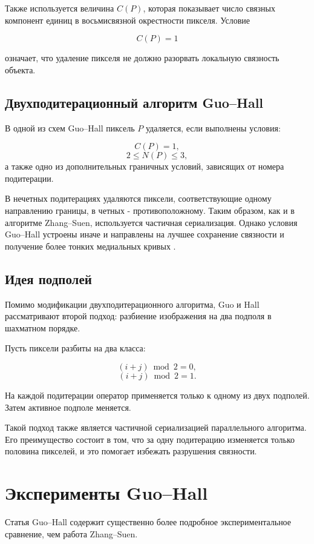 \documentclass[12pt,a4paper]{article}
\begin{document}
	Также используется величина $C(P)$, которая показывает число связных компонент единиц в восьмисвязной окрестности пикселя. Условие
	
	\[
	C(P)=1
	\]
	
	означает, что удаление пикселя не должно разорвать локальную связность объекта.
	
	\subsection{Двухподитерационный алгоритм Guo--Hall}
	
	В одной из схем Guo--Hall пиксель $P$ удаляется, если выполнены условия:
	
	\[
	C(P)=1,
	\]
	\[
	2 \le N(P) \le 3,
	\]
	а также одно из дополнительных граничных условий, зависящих от номера подитерации.
	
	В нечетных подитерациях удаляются пиксели, соответствующие одному направлению границы, в четных - противоположному. Таким образом, как и в алгоритме Zhang--Suen, используется частичная сериализация. Однако условия Guo--Hall устроены иначе и направлены на лучшее сохранение связности и получение более тонких медиальных кривых \cite{guo1989}.
	
	\subsection{Идея подполей}
	
	Помимо модификации двухподитерационного алгоритма, Guo и Hall рассматривают второй подход: разбиение изображения на два подполя в шахматном порядке.
	
	Пусть пиксели разбиты на два класса:
	
	\[
	(i+j)\bmod 2 = 0,
	\]
	\[
	(i+j)\bmod 2 = 1.
	\]
	
	На каждой подитерации оператор применяется только к одному из двух подполей. Затем активное подполе меняется.
	
	Такой подход также является частичной сериализацией параллельного алгоритма. Его преимущество состоит в том, что за одну подитерацию изменяется только половина пикселей, и это помогает избежать разрушения связности.
	
	\section{Эксперименты Guo--Hall}
	
	Статья Guo--Hall содержит существенно более подробное экспериментальное сравнение, чем работа Zhang--Suen.
	
\end{document}
